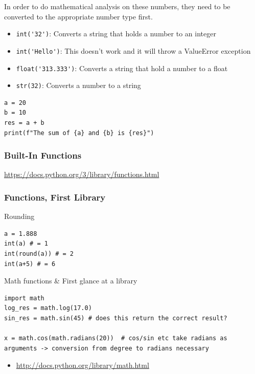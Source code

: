 \documentclass[10pt, a4paper]{beamer} %
\begin{document}
\begin{frame}
In order to do mathematical analysis on these numbers, they need to be converted to the appropriate number type first.

\begin{itemize}
  \item \lstinline!int('32')!: Converts a string that holds a number to an integer
  \item \lstinline!int('Hello')!: This doesn't work and it will throw a ValueError exception
  \item \lstinline!float('313.333')!: Converts a string that hold a number to a float
  \item \lstinline!str(32)!: Converts a number to a string
\end{itemize}

\begin{examples}
\begin{lstlisting}
a = 20
b = 10
res = a + b
print(f"The sum of {a} and {b} is {res}")
\end{lstlisting}
\end{examples}
\end{frame}

\begin{frame}[c]\frametitle{Built-In Functions}
    \url{https://docs.python.org/3/library/functions.html}
\end{frame}

\begin{frame}[c, fragile]\frametitle{Functions, First Library}
\begin{block}{Rounding}
    \begin{lstlisting}
a = 1.888
int(a) # = 1
int(round(a)) # = 2
int(a+5) # = 6
    \end{lstlisting}
\end{block}
\begin{block}{Math functions \& First glance at a library}
  \begin{lstlisting}
import math
log_res = math.log(17.0)
sin_res = math.sin(45) # does this return the correct result?

x = math.cos(math.radians(20))  # cos/sin etc take radians as arguments -> conversion from degree to radians necessary    
  \end{lstlisting}
  \begin{itemize}
    \item \tiny \url{http://docs.python.org/library/math.html}
  \end{itemize}
\end{block}
\end{frame}
\end{document}
